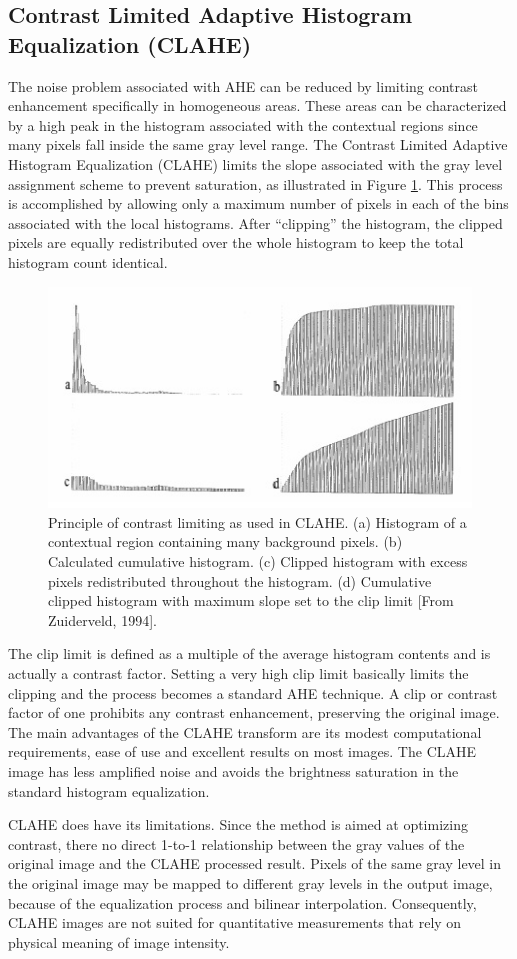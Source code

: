 \subsection{Contrast Limited Adaptive Histogram Equalization (CLAHE)}
The noise problem associated with AHE can be reduced by limiting
contrast enhancement specifically in homogeneous areas. These areas can be
characterized by a high peak in the histogram associated with the contextual
regions since many pixels fall inside the same gray level range. The Contrast
Limited Adaptive Histogram Equalization (CLAHE) limits the slope associated
with the gray level assignment scheme to prevent saturation, as illustrated in
Figure \ref{CLAHE}. This process is accomplished by allowing only a maximum number of
pixels in each of the bins associated with the local histograms. After “clipping” the
histogram, the clipped pixels are equally redistributed over the whole histogram
to keep the total histogram count identical\cite{he2}.
\begin{figure}
	\centering
	\includegraphics[scale=1]{images/ch3/CLAHE.jpg}
	\caption{Principle of contrast limiting as used in CLAHE. (a)
Histogram of a contextual region containing many background pixels.
(b) Calculated cumulative histogram. (c) Clipped histogram with excess
pixels redistributed throughout the histogram. (d) Cumulative clipped
histogram with maximum slope set to the clip limit [From Zuiderveld,
1994].}
\label{CLAHE}
\end{figure}

The clip limit is defined as a multiple of the average histogram contents
and is actually a contrast factor. Setting a very high clip limit basically limits the clipping and the process becomes a standard AHE technique\cite{he1}. A clip or contrast
factor of one prohibits any contrast enhancement, preserving the original image.
The main advantages of the CLAHE transform are its modest
computational requirements, ease of use and excellent results on most images. The CLAHE image has less amplified noise and avoids the brightness saturation in the standard histogram equalization\cite{he1}.

CLAHE does have its limitations. Since the method is aimed at optimizing
contrast, there no direct 1-to-1 relationship between the gray values of the
original image and the CLAHE processed result\cite{he2}. Pixels of the same gray level in
the original image may be mapped to different gray levels in the output image,
because of the equalization process and bilinear interpolation. Consequently,
CLAHE images are not suited for quantitative measurements that rely on
physical meaning of image intensity.

